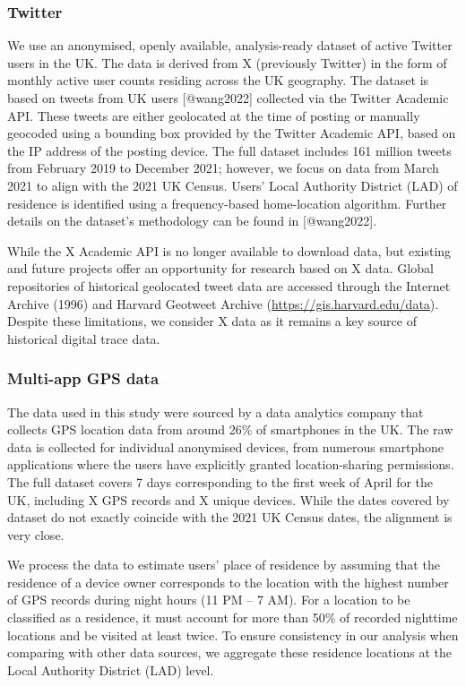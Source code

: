 \documentclass[]{rsos}%
\begin{document}
\subsubsection{Twitter}\label{twitter}

We use an anonymised, openly available, analysis-ready dataset of active
Twitter users in the UK. The data is derived from X (previously Twitter)
in the form of monthly active user counts residing across the UK
geography. The dataset is based on tweets from UK users {[}@wang2022{]}
collected via the Twitter Academic API. These tweets are either
geolocated at the time of posting or manually geocoded using a bounding
box provided by the Twitter Academic API, based on the IP address of the
posting device. The full dataset includes 161 million tweets from
February 2019 to December 2021; however, we focus on data from March
2021 to align with the 2021 UK Census. Users' Local Authority District
(LAD) of residence is identified using a frequency-based home-location
algorithm. Further details on the dataset's methodology can be found in
{[}@wang2022{]}.

While the X Academic API is no longer available to download data, but
existing and future projects offer an opportunity for research based on
X data. Global repositories of historical geolocated tweet data are
accessed through the Internet Archive (1996) and Harvard Geotweet
Archive (\url{https://gis.harvard.edu/data}). Despite these limitations, we
consider X data as it remains a key source of historical digital trace
data.

\subsubsection{Multi-app GPS data}\label{multi-app-gps-data}

The data used in this study were sourced by a data analytics company
that collects GPS location data from around 26\% of smartphones in the
UK. The raw data is collected for individual anonymised devices, from
numerous smartphone applications where the users have explicitly granted
location-sharing permissions. The full dataset covers 7 days
corresponding to the first week of April for the UK, including X GPS
records and X unique devices. While the dates covered by dataset do not
exactly coincide with the 2021 UK Census dates, the alignment is very
close.

We process the data to estimate users' place of residence by assuming
that the residence of a device owner corresponds to the location with
the highest number of GPS records during night hours (11 PM -- 7 AM). For
a location to be classified as a residence, it must account for more
than 50\% of recorded nighttime locations and be visited at least twice.
To ensure consistency in our analysis when comparing with other data
sources, we aggregate these residence locations at the Local Authority
District (LAD) level.
\end{document}
